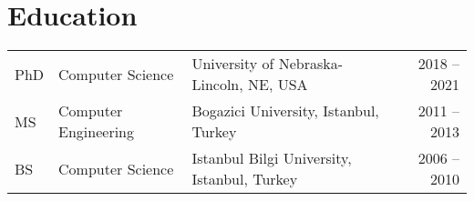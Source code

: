 \documentclass[a4paper,10pt]{article}
\begin{document}
\maketitle


\section{Education}
\vspace{0.3cm}
\begin{tabular}{p{1cm}p{4cm}p{7cm}r}
PhD & Computer Science & University of Nebraska-Lincoln, NE, USA & 2018 -- 2021\\
MS & Computer Engineering & Bogazici University, Istanbul, Turkey & 2011 -- 2013\\
BS & Computer Science & Istanbul Bilgi University, Istanbul, Turkey & 2006 -- 2010
\end{tabular}
\vspace{0.5cm}
\end{document}

